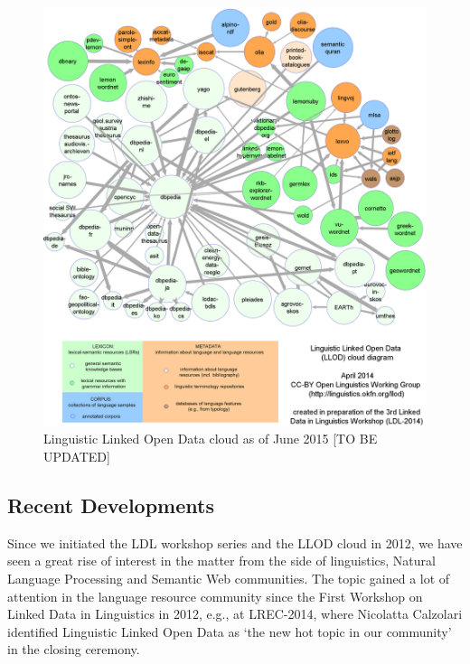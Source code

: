 \begin{figure}[t]
 \begin{center}
 \includegraphics[width=1.0\textwidth]{llod-colored.png}
 \end{center}
\caption{Linguistic Linked Open Data cloud as of June 2015 [TO BE UPDATED]}
\label{figI18nLOD}
\end{figure}

\subsection{Recent Developments}

Since we initiated the LDL workshop series and the LLOD cloud in 2012, we have seen a great rise of interest in the matter from the side of linguistics, Natural Language Processing and Semantic Web communities. The topic gained a lot of attention in the language resource community since the First Workshop on Linked Data in Linguistics in 2012, e.g., at LREC-2014, where Nicolatta Calzolari identified Linguistic Linked Open Data as `the new hot topic in our community' in the closing ceremony.


